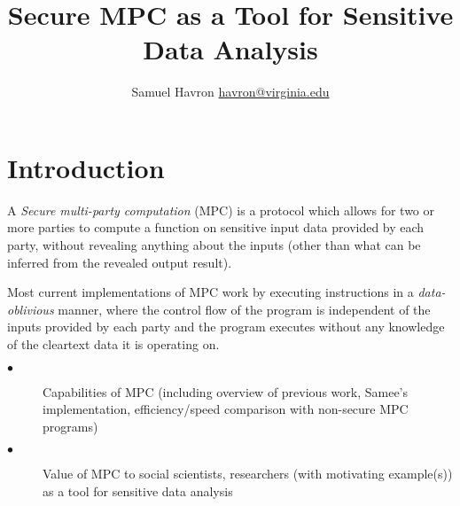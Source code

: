 \documentclass{article}
\author{Samuel Havron \textlangle{}\href{mailto:havron@virginia.edu}{havron@virginia.edu}\textrangle{}}
\title{\textbf{Secure MPC as a Tool for Sensitive Data Analysis}}
\begin{document}
\maketitle
\section{Introduction}
A \emph{Secure multi-party computation} (MPC) is a protocol which allows for two or more parties to compute a function on sensitive input data provided by each party, without revealing anything about the inputs (other than what can be inferred from the revealed output result). 

Most current implementations of MPC work by executing instructions in a \emph{data-oblivious} manner, where the control flow of the program is independent of the inputs provided by each party and the program executes without any knowledge of the cleartext data it is operating on.  %





\begin{description}
\item[$\bullet$] Capabilities of MPC (including overview of previous work, Samee's implementation, efficiency/speed comparison with non-secure MPC programs) 
\item[$\bullet$] Value of MPC to social scientists, researchers (with motivating example(s)) as a tool for sensitive data analysis
\end{description}
\end{document}
